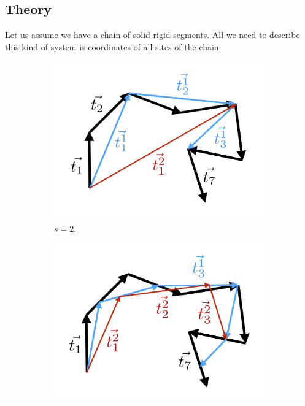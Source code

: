\documentclass[12pt]{article}
\begin{document}
\begin{mySection}[Algorithm]\label{sec:theory}
\subsection{Theory}
Let us assume we have a chain of solid rigid segments. All we need to describe this kind of system is coordinates of all sites of the chain.
\begin{figure}
	\centering
	\vskip -0cm 
	\begin{subfigure}{0.45\linewidth}
  		\includegraphics[width=1.0\linewidth]{figure-1.pdf}
  		\caption{$s = 2$.}
  	\end{subfigure}
  	\begin{subfigure}{0.45\linewidth}
  		\includegraphics[width=1.0\linewidth]{figure-2.pdf}

\end{subfigure}
\end{figure}
\end{mySection}
\end{document}
